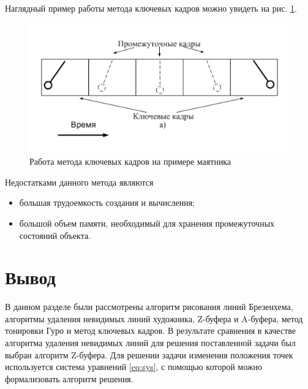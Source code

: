 Наглядный пример работы метода ключевых кадров можно увидеть на рис. \ref{fig:keyframe}\cite{web:keyframe}.

\begin{figure}[ht!]
	\centering
	\includegraphics[scale=0.7]{keyframe}
	\caption{Работа метода ключевых кадров на примере маятника}
	\label{fig:keyframe}
\end{figure}

\vspace{0.3cm}Недостатками данного метода являются
\begin{itemize}
	\item большая трудоемкость создания и вычисления;
	\item большой объем памяти, необходимый для хранения промежуточных состояний объекта.
\end{itemize}

\section{Вывод}
\hspace{0.6cm}В данном разделе были рассмотрены алгоритм рисования линий Брезенхема, алгоритмы удаления невидимых линий художника, Z-буфера и A-буфера, метод тонировки Гуро и метод ключевых кадров. В результате сравнения в качестве алгоритма удаления невидимых линий для решения поставленной задачи был выбран алгоритм Z-буфера.
Для решении задачи изменения положения точек используется система уравнений \ref{eq:sys}, с помощью которой можно формализовать алгоритм решения.
	
